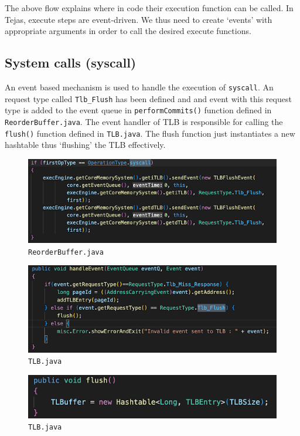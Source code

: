 \documentclass[11pt]{article}
\begin{document}
The above flow explains where in code their execution function can be called. In Tejas, execute steps are event-driven. We thus need to create `events' with appropriate arguments in order to call the desired execute functions.
\subsection{System calls (syscall)}
An event based mechanism is used to handle the execution of \texttt{syscall}. An request type called \texttt{Tlb\_Flush} has been defined and and event with this request type is added to the event queue in \texttt{performCommits()} function defined in \texttt{ReorderBuffer.java}. The event handler of TLB is responsible for calling the \texttt{flush()} function defined in \texttt{TLB.java}. The flush function just instantiates a new hashtable thus `flushing' the TLB effectively.
\begin{figure}[H]
\centering
\includegraphics[scale = 0.6]{screenshots/ReorderBufferSyscall.png}
\caption{\texttt{ReorderBuffer.java}}
\label{fig:RBSys}
\end{figure}
\begin{figure}[H]
\centering
\includegraphics[scale = 0.6]{screenshots/TLBHandleEvent.png}
\caption{\texttt{TLB.java}}
\label{fig:TLBHE}
\end{figure}
\begin{figure}[H]
\centering
\includegraphics[scale = 0.6]{screenshots/TLBFlush.png}
\caption{\texttt{TLB.java}}
\label{fig:TLBFlush}
\end{figure}
\end{document}
